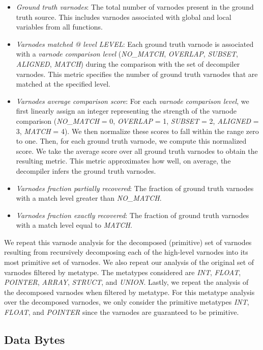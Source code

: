 \begin{itemize}
    \item \emph{Ground truth varnodes}: The total number of varnodes present in the ground truth source. This includes varnodes associated with global and local variables from all functions.
    \item \emph{Varnodes matched @ level LEVEL}: Each ground truth varnode is associated with a \emph{varnode comparison level} (\emph{NO\_MATCH}, \emph{OVERLAP}, \emph{SUBSET}, \emph{ALIGNED}, \emph{MATCH}) during the comparison with the set of decompiler varnodes. This metric specifies the number of ground truth varnodes that are matched at the specified level.
    \item \emph{Varnodes average comparison score}: For each \emph{varnode comparison level}, we first linearly assign an integer representing the strength of the varnode comparison (\emph{NO\_MATCH} = 0, \emph{OVERLAP} = 1, \emph{SUBSET} = 2, \emph{ALIGNED} = 3, \emph{MATCH} = 4). We then normalize these scores to fall within the range zero to one. Then, for each ground truth varnode, we compute this normalized score. We take the average score over all ground truth varnodes to obtain the resulting metric. This metric approximates how well, on average, the decompiler infers the ground truth varnodes.
    \item \emph{Varnodes fraction partially recovered}: The fraction of ground truth varnodes with a match level greater than \emph{NO\_MATCH}.
    \item \emph{Varnodes fraction exactly recovered}: The fraction of ground truth varnodes with a match level equal to \emph{MATCH}.
\end{itemize}

We repeat this varnode analysis for the decomposed (primitive) set of varnodes resulting from recursively decomposing each of the high-level varnodes into its most primitive set of varnodes. We also repeat our analysis of the original set of varnodes filtered by metatype. The metatypes considered are \emph{INT}, \emph{FLOAT}, \emph{POINTER}, \emph{ARRAY}, \emph{STRUCT}, and \emph{UNION}. Lastly, we repeat the analysis of the decomposed varnodes when filtered by metatype. For this metatype analysis over the decomposed varnodes, we only consider the primitive metatypes \emph{INT}, \emph{FLOAT}, and \emph{POINTER} since the varnodes are guaranteed to be primitive.

\subsection{Data Bytes}

